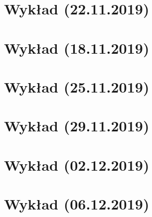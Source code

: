 \documentclass[a5]{article}
\begin{document}
\section{Wykład (22.11.2019)}

\pagebreak
\section{Wykład (18.11.2019)}

\pagebreak
\section{Wykład (25.11.2019)}

\pagebreak
\section{Wykład (29.11.2019)}

\pagebreak
\section{Wykład (02.12.2019)}

\pagebreak
\section{Wykład (06.12.2019)}

\end{document}
